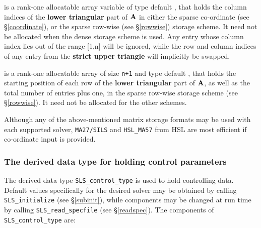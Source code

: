 \documentclass{galahad}
\newcommand{\packagename}{SLS}
\begin{document}
\begin{description}
 is a rank-one allocatable array variable of type default \integer,
that holds the column indices of the {\bf lower triangular} part of
${\mathbf{A}}$ in either the sparse co-ordinate
(see \S\ref{coordinate}), or the sparse row-wise
(see \S\ref{rowwise}) storage scheme.
It need not be allocated when the dense
storage scheme is used.
Any entry whose column index lies out of the range $[$1,n$]$ will be ignored,
while the row and column indices of any entry from the
{\bf strict upper triangle} will implicitly be swapped.

 is a rank-one allocatable array of size {\tt n+1} and type
default \integer, that holds the starting position of
each row of the {\bf lower triangular} part of ${\mathbf{A}}$, as well
as the total number of entries plus one, in the sparse row-wise storage
scheme (see \S\ref{rowwise}). It need not be allocated for the
other schemes.

\end{description}
Although any of the above-mentioned matrix storage formats may be used
with each supported solver, {\tt MA27/SILS} and {\tt HSL\_MA57}
from HSL are most efficient if co-ordinate input is provided.


\subsubsection{The derived data type for holding control
 parameters}\label{typecontrol}
The derived data type
{\tt \packagename\_control\_type}
is used to hold controlling data.
Default values specifically for the desired solver
may be obtained by calling
{\tt \packagename\_initialize}
(see \S\ref{subinit}),
while components may be changed at run time by calling
{\tt \packagename\_read\-\_specfile}
(see \S\ref{readspec}).
The components of
{\tt \packagename\_control\_type}
are:
\end{document}
